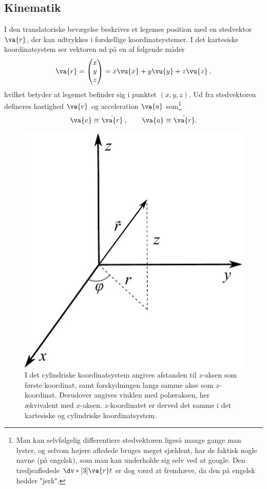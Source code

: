 \subsection{Kinematik}
I den translatoriske bevægelse beskrives et legemes position med en stedvektor $\va{r}$, der kan udtrykkes i forskellige koordinatsystemer. I det kartesiske koordinatsystem ser vektoren ud på en af følgende måder
%
\begin{align*}
	\va{r} = \begin{pmatrix}x \\ y \\ z \end{pmatrix} = x\vu{x} + y\vu{y} + z\vu{z} \: ,
\end{align*}
%
hvilket betyder at legemet befinder sig i punktet $(x,y,z)$. Ud fra stedvektoren defineres hastighed $\va{v}$ og acceleration $\va{a}$ som\footnote{Man kan selvfølgelig differentiere stedvektoren ligeså mange gange man lyster, og selvom højere afledede bruges meget sjældent, har de faktisk nogle navne (på engelsk), som man kan underholde sig selv ved at google. Den tredjeafledede $\dv*[3]{\va{r}}{t}$ er dog værd at fremhæve, da den på engelsk hedder "jerk".}
\begin{equation}
    \va{v} \equiv \dot{\va{r}} \: , \qquad \va{a} \equiv \ddot{\va{r}}.
\end{equation}
%
\begin{figure}[h!]
\centering
\includegraphics[width=.4\textwidth]{figurer/CylindriskeKoordinater}
\caption{I det cylindriske koordinatsystem angives afstanden til $z$-aksen som første koordinat, samt forskydningen langs samme akse som $z$-koordinat. Derudover angives vinklen med polæraksen, her ækvivalent med $x$-aksen. $z$-koordinatet er derved det samme i det kartesiske og cylindriske koordinatsystem.}
\label{mek:fig:CylindriskeKoordinater}
\end{figure}
%
%
